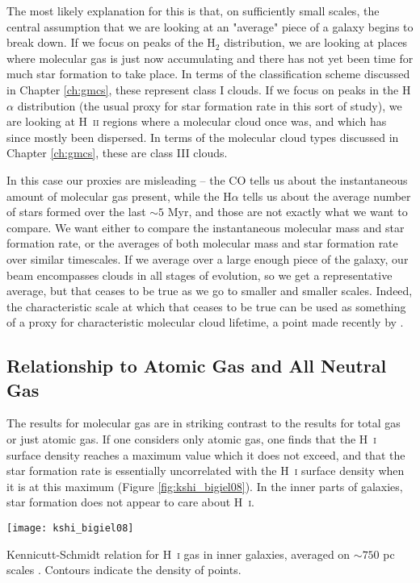 The most likely explanation for this is that, on sufficiently small scales, the central assumption that we are looking at an "average" piece of a galaxy begins to break down. If we focus on peaks of the H$_2$ distribution, we are looking at places where molecular gas is just now accumulating and there has not yet been time for much star formation to take place. In terms of the classification scheme discussed in Chapter \ref{ch:gmcs}, these represent class I clouds. If we focus on peaks in the H$\alpha$ distribution (the usual proxy for star formation rate in this sort of study), we are looking at H~\textsc{ii} regions where a molecular cloud once was, and which has since mostly been dispersed. In terms of the molecular cloud types discussed in Chapter \ref{ch:gmcs}, these are class III clouds.

In this case our proxies are misleading -- the CO tells us about the instantaneous amount of molecular gas present, while the H$\alpha$ tells us about the average number of stars formed over the last $\sim 5$ Myr, and those are not exactly what we want to compare. We want either to compare the instantaneous molecular mass and star formation rate, or the averages of both molecular mass and star formation rate over similar timescales. If we average over a large enough piece of the galaxy, our beam encompasses clouds in all stages of evolution, so we get a representative average, but that ceases to be true as we go to smaller and smaller scales. Indeed, the characteristic scale at which that ceases to be true can be used as something of a proxy for characteristic molecular cloud lifetime, a point made recently by \citet{kruijssen14c}.


\subsection{Relationship to Atomic Gas and All Neutral Gas}

The results for molecular gas are in striking contrast to the results for total gas or just atomic gas. If one considers only atomic gas, one finds that the H~\textsc{i} surface density reaches a maximum value which it does not exceed, and that the star formation rate is essentially uncorrelated with the H~\textsc{i} surface density when it is at this maximum (Figure \ref{fig:kshi_bigiel08}). In the inner parts of galaxies, star formation does not appear to care about H~\textsc{i}.
\begin{marginfigure}
\texttt{[image: kshi\_bigiel08]}
\caption[Kennicutt-Schmidt relation for H~\textsc{i} gas in inner galaxies]{
\label{fig:kshi_bigiel08}
Kennicutt-Schmidt relation for H~\textsc{i} gas in inner galaxies, averaged on $\sim 750$ pc scales \citep{bigiel08a}. Contours indicate the density of points.
}
\end{marginfigure}

